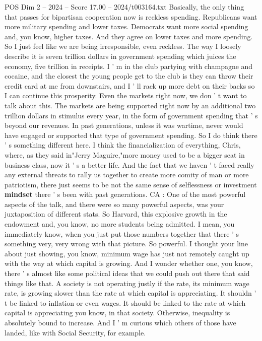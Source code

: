 \begin{textsample}{POS Dim 2 – 2024 – Score 17.00 – 2024/t003164.txt}
Basically, the only thing that passes for bipartisan cooperation now is reckless spending.
Republicans want more military spending and lower taxes.
Democrats want more social spending and, you know, higher taxes.
And they agree on lower taxes and more spending.
So I just feel like we are being irresponsible, even reckless.
The way I loosely describe it is seven trillion dollars in government spending which juices the economy, five trillion in receipts.
I ' m in the club partying with champagne and cocaine, and the closest the young people get to the club is they can throw their credit card at me from downstairs, and I ' ll rack up more debt on their backs so I can continue this prosperity.
Even the markets right now, we don ' t want to talk about this.
The markets are being supported right now by an additional two trillion dollars in stimulus every year, in the form of government spending that ' s beyond our revenues.
In past generations, unless it was wartime, never would have engaged or supported that type of government spending.
So I do think there ' s something different here.
I think the financialization of everything, Chris, where, as they said in"Jerry Maguire,"more money used to be a bigger seat in business class, now it ' s a better life.
And the fact that we haven ' t faced really any external threats to rally us together to create more comity of man or more patriotism, there just seems to be not the same sense of selflessness or investment \textbf{mindset} there ' s been with past generations.
CA : One of the most powerful aspects of the talk, and there were so many powerful aspects, was your juxtaposition of different stats.
So Harvard, this explosive growth in the endowment and, you know, no more students being admitted.
I mean, you immediately know, when you just put those numbers together that there ' s something very, very wrong with that picture.
So powerful.
I thought your line about just showing, you know, minimum wage has just not remotely caught up with the way at which capital is growing.
And I wonder whether one, you know, there ' s almost like some political ideas that we could push out there that said things like that.
A society is not operating justly if the rate, its minimum wage rate, is growing slower than the rate at which capital is appreciating.
It shouldn ' t be linked to inflation or even wages.
It should be linked to the rate at which capital is appreciating you know, in that society.
Otherwise, inequality is absolutely bound to increase.
And I ' m curious which others of those have landed, like with Social Security, for example.

\end{textsample}
